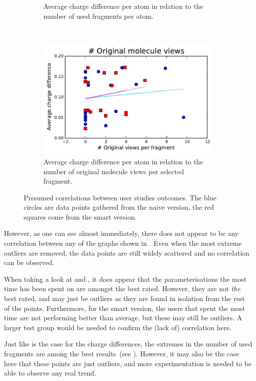 \begin{figure}[h!]
\begin{subfigure}[t]{0.48\textwidth}
\caption{Average charge difference per atom in relation to the number of used fragments per atom.}
\end{subfigure}%
~
\begin{subfigure}[t]{0.48\textwidth}
\centering
\includegraphics[width=\textwidth]{img/graphs/3a_03.pdf}
\caption{Average charge difference per atom in relation to the number of original molecule views per selected fragment.}
\end{subfigure}
\caption{Presumed correlations between user studies outcomes. The blue circles are data points gathered from the naive version, the red squares come from the smart version.}
\end{figure}

However, as one can see almost immediately, there does not appear to be any correlation between any of the graphs shown in . Even when the most extreme outliers are removed, the data points are still widely scattered and no correlation can be observed.

When taking a look at  and , it does appear that the parameterisations the most time has been spent on are amongst the best rated. However, they are not \emph{the} best rated, and may just be outliers as they are found in isolation from the rest of the points. Furthermore, for the smart version, the users that spent the most time are not performing better than average, but these may still be outliers. A larger test group would be needed to confirm the (lack of) correlation here.

Just like is the case for the charge differences, the extremes in the number of used fragments are among the best results~(see ). However, it may also be the case here that these points are just outliers, and more experimentation is needed to be able to observe any real trend.

